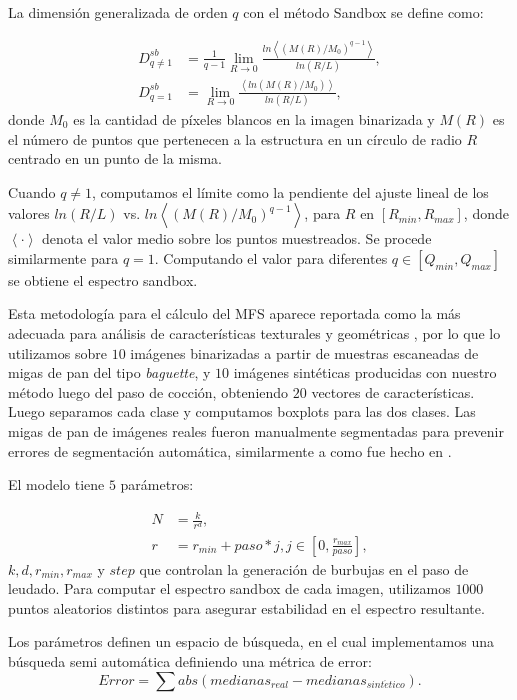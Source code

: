 La dimensión generalizada de orden $q$ con el método Sandbox se define como:

 \begin{align*}
D_{q\ne 1}^{sb} &= \frac{1}{q-1} \lim_{R \rightarrow 0}{
\frac{ln   { \left\langle  (M(R)/M_{0})^{q-1} \right\rangle   }}
{ln {(R/L)}       }},\\
D_{q=1}^{sb} &= \lim_{R \rightarrow 0}{
\frac{ \left\langle ln   { (M(R)/M_{0})  }  \right\rangle}
{ln {(R/L)}       }},
\end{align*}
%
donde $M_{0}$ es la cantidad de píxeles blancos en la imagen binarizada y $M(R)$ es el número de puntos que pertenecen a la estructura en un círculo de radio $R$ centrado en un punto de la misma.

Cuando $q\ne1$, computamos el límite como la pendiente del ajuste lineal de los valores $ln(R/L)$ vs. $ ln  \left\langle  { (M(R)/M_{0})^{q-1} }  \right\rangle$, para $R$ en $[R_{min}, R_{max}]$, donde $ \left\langle \cdot  \right\rangle$ denota el valor medio sobre los puntos muestreados.
Se procede similarmente para $q=1$. 
Computando el valor para diferentes $q \in [Q_{min},Q_{max}]$  se obtiene el espectro sandbox.

Esta metodología para el cálculo del MFS aparece reportada como la más adecuada para análisis de características texturales y geométricas \cite{Gonzales2008}, por lo que lo utilizamos sobre $10$ imágenes binarizadas a partir de muestras escaneadas de migas de pan del tipo {\em baguette}, y $10$ imágenes sintéticas producidas con nuestro método luego del paso de cocción, obteniendo $20$ vectores de características.
Luego separamos cada clase y computamos boxplots para las dos clases.
Las migas de pan de imágenes reales fueron manualmente segmentadas para prevenir errores de segmentación automática, similarmente a como fue hecho en \cite{Bosch2011}.

El modelo tiene $5$ parámetros:

\begin{align*}
N &= \frac{k}{r^{d}},\\ r &= r_{min}+paso*j, j \in [0,\frac{r_{max}}{paso}],
\end{align*}
$k,d,r_{min},r_{max}$ y $step$ que controlan la generación de burbujas en el paso de leudado.
Para computar el espectro sandbox de cada imagen, utilizamos $1000$ puntos aleatorios distintos para asegurar estabilidad en el espectro resultante.

Los parámetros definen un espacio de búsqueda, en el cual implementamos una búsqueda semi automática definiendo una métrica de error:
\begin{equation*}
Error = \displaystyle \sum abs(medianas_{real}-medianas_{sint\acute{e}tico}).
\end{equation*}

